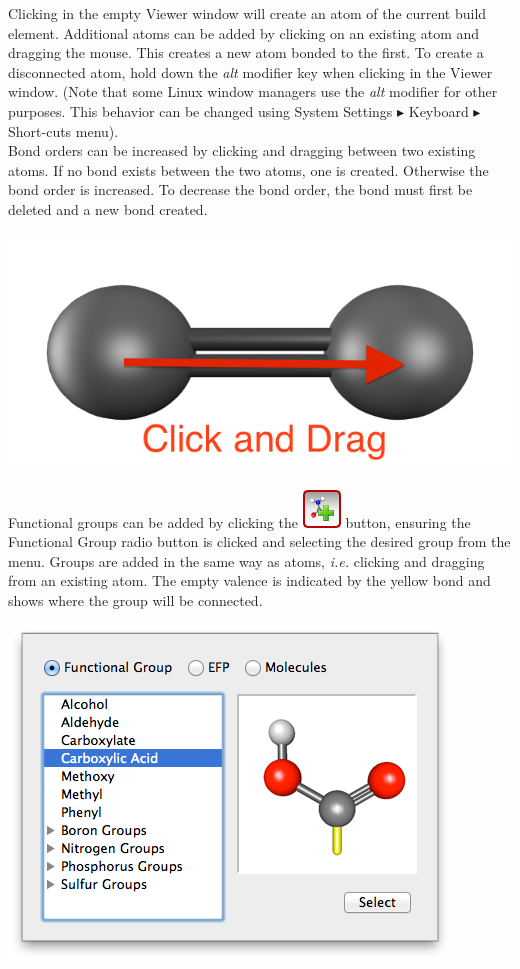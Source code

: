 \documentclass[a4paper,12pt]{article}
\begin{document}
Clicking in the empty Viewer window will create an atom of the current build
element. Additional atoms can be added by clicking on an existing atom and
dragging the mouse.  This creates a new atom bonded to the first.  To create a
disconnected atom, hold down the \emph{alt} modifier key when clicking in the
Viewer window.  (Note that some Linux window managers use the \emph{alt} modifier
for other purposes.  This behavior can be changed using System Settings 
$\blacktriangleright$ Keyboard $\blacktriangleright$ Short-cuts menu). \\

Bond orders can be increased by clicking and dragging between two existing
atoms.  If no bond exists between the two atoms,  one is created.  Otherwise
the bond order is increased.  To decrease the bond order, the bond must first
be deleted and a new bond created.
\begin{center}
\includegraphics[scale=0.25]{figures/Cdouble.png}
\end{center}


Functional groups can be added by clicking the
\includegraphics[scale=0.40]{figures/BuildFragButton.png} button, ensuring the
Functional Group radio button is clicked and selecting the desired group from
the menu.  Groups are added in the same way as atoms, \emph{i.e.} clicking and
dragging from an existing atom.  The empty valence is indicated by the yellow
bond and shows where the group will be connected.
\begin{center}
\includegraphics[scale=0.5]{figures/FunctionalGroup.png}
\end{center}
\end{document}
